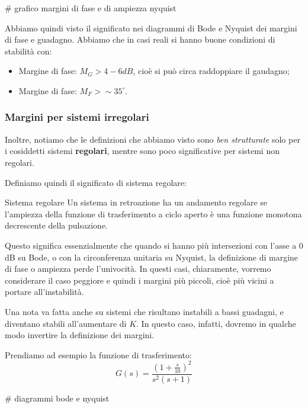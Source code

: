 \documentclass[a4paper,11pt]{article}
\begin{document}
# grafico margini di fase e di ampiezza nyquist 

\par\medskip

Abbiamo quindi visto il significato nei diagrammi di Bode e Nyquist dei margini di fase e guadagno.
Abbiamo che in casi reali si hanno buone condizioni di stabilità con:
\begin{itemize}
	\item Margine di fase: $M_G > 4 - 6 dB$, cioè si può circa raddoppiare il gaudagno;
	\item Margine di fase: $M_F > \sim 35^\circ$.
\end{itemize}

\subsubsection{Margini per sistemi irregolari}
Inoltre, notiamo che le definizioni che abbiamo visto sono \textit{ben strutturate} solo per i cosiddetti sistemi \textbf{regolari}, mentre sono poco significative per sistemi non regolari.

Definiamo quindi il significato di sistema regolare:
\begin{definition}{Sistema regolare}
	Un sistema in retroazione ha un andamento regolare se l'ampiezza della funzione di trasferimento a ciclo aperto è una funzione monotona decrescente della pulsazione.
\end{definition}

Questo significa essenzialmente che quando si hanno più intersezioni con l'asse a 0 dB su Bode, o con la circonferenza unitaria su Nyquist, la definizione di margine di fase o ampiezza perde l'univocità.
In questi casi, chiaramente, vorremo considerare il caso peggiore e quindi i margini più piccoli, cioè più vicini a portare all'instabilità.

\par\medskip

Una nota va fatta anche su sistemi che risultano instabili a bassi guadagni, e diventano stabili all'aumentare di $K$.
In questo caso, infatti, dovremo in qualche modo invertire la definizione dei margini.

Prendiamo ad esempio la funzione di trasferimento:
$$
G(s) = \frac{\left(1 + \frac{s}{10}\right)^2}{s^2 (s + 1)}
$$

# diagrammi bode e nyquist
\end{document}
